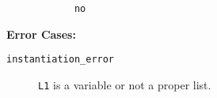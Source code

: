 \begin{description}
{\begin{verbatim}
            no \end{verbatim}}

{\bf Error Cases:}
\begin{description} 
\item[{\tt instantiation\_error}]
     {\tt L1} is a variable or not a proper list.  
\end{description}
\end{description}

